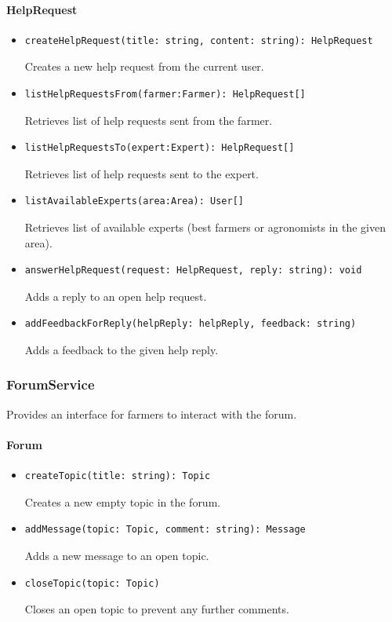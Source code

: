 \documentclass{article}
\begin{document}
\paragraph{HelpRequest}
\begin{itemize}
\item \begin{verbatim}
createHelpRequest(title: string, content: string): HelpRequest
\end{verbatim}
Creates a new help request from the current user.
\item \begin{verbatim}
listHelpRequestsFrom(farmer:Farmer): HelpRequest[]
\end{verbatim}
Retrieves list of help requests sent from the farmer.
\item \begin{verbatim}
listHelpRequestsTo(expert:Expert): HelpRequest[]
\end{verbatim}
Retrieves list of help requests sent to the expert.
\item \begin{verbatim}
listAvailableExperts(area:Area): User[]
\end{verbatim}
Retrieves list of available experts (best farmers or agronomists in the given area).
\item \begin{verbatim}
answerHelpRequest(request: HelpRequest, reply: string): void
\end{verbatim}
Adds a reply to an open help request.
\item \begin{verbatim}
addFeedbackForReply(helpReply: helpReply, feedback: string)
\end{verbatim}
Adds a feedback to the given help reply.
\end{itemize}

\subsubsection{ForumService}
Provides an interface for farmers to interact with the forum.

\paragraph{Forum}
\begin{itemize}
\item \begin{verbatim}
createTopic(title: string): Topic
\end{verbatim}
Creates a new empty topic in the forum.
\item \begin{verbatim}
addMessage(topic: Topic, comment: string): Message
\end{verbatim}
Adds a new message to an open topic.
\item \begin{verbatim}
closeTopic(topic: Topic)
\end{verbatim}
Closes an open topic to prevent any further comments.
\end{itemize}
\end{document}
